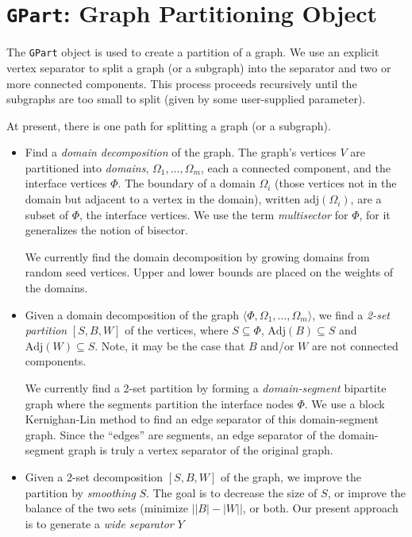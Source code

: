 \chapter{{\tt GPart}: Graph Partitioning Object}
\label{chapter:GPart:intro}
\par
The {\tt GPart} object is used to create a partition of a graph.
We use an explicit vertex separator to split a graph (or a
subgraph) into the separator and two or more connected components.
This process proceeds recursively until the subgraphs are too small
to split (given by some user-supplied parameter).
\par
At present, there is one path for splitting a graph (or a subgraph).
\begin{itemize}
\item
Find a {\it domain decomposition} of the graph.
The graph's vertices $V$ are partitioned into {\it domains},
$\Omega_1, \ldots, \Omega_m$, each a connected component,
and the interface vertices $\Phi$.
The boundary of a domain $\Omega_i$ (those vertices not in the domain 
but adjacent to a vertex in the domain), written
$\mbox{adj}(\Omega_i)$, are a subset of $\Phi$, the interface
vertices.
We use the term {\it multisector} for $\Phi$, for it generalizes
the notion of bisector.
\par
We currently find the domain decomposition by growing domains from
random seed vertices.
Upper and lower bounds are placed on the weights of the domains.
\item
Given a domain decomposition of the graph $\langle \Phi, \Omega_1,
\ldots, \Omega_m \rangle$, we find a {\it 2-set partition}
$[S, B, W]$ of the vertices, where $S \subseteq \Phi$, 
$\mbox{Adj}(B) \subseteq S$ and $\mbox{Adj}(W) \subseteq S$.
Note, it may be the case that $B$ and/or $W$ are not connected
components.
\par
We currently find a 2-set partition by forming a {\it
domain-segment} bipartite graph where the segments partition the
interface nodes $\Phi$.
We use a block Kernighan-Lin method to find an edge separator of
this domain-segment graph.
Since the ``edges'' are segments, an edge separator of the
domain-segment graph is truly a vertex separator of the original
graph.
\item
Given a 2-set decomposition $[S,B,W]$ of the graph, we improve
the partition by {\it smoothing} $S$.
The goal is to decrease the size of $S$, or improve the balance
of the two sets (minimize $\left| |B| - |W| \right |$, or both.
Our present approach is to generate a {\it wide separator} $Y$

\end{itemize}
